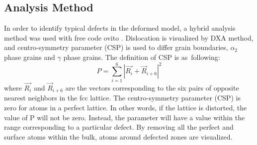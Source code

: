\documentclass[materials,article,accept,moreauthors,pdftex,10pt,a4paper]{Definitions/mdpi}
\begin{document}
\subsection{Analysis Method}
In order to identify typical defects in the deformed model, a hybrid analysis method was used with free code ovito \cite{Stukowski2010}. Dislocation is visualized by DXA method, and centro-symmetry parameter (CSP) is used to differ grain boundaries, $\alpha_2$ phase grains and $\gamma$ phase grains. The definition of CSP is as~following:
\begin{equation} \label{eq:csp}
P = \displaystyle\sum_{i=1}^{6}|\vec{R_i}+{\vec{R}}_{i+6}|^2
\end{equation}
where $\vec{R_i}$ and ${\vec{R}}_{i+6}$ are the vectors corresponding to the six pairs of opposite nearest neighbors in the fcc lattice. The centro-symmetry parameter (CSP) is zero for atoms in a perfect lattice. In other words, if the lattice is distorted, the value of P will not be zero. Instead, the parameter will have a value within the range corresponding to a particular defect. By removing all the perfect and surface atoms within the bulk, atoms around defected zones are visualized.
\end{document}
